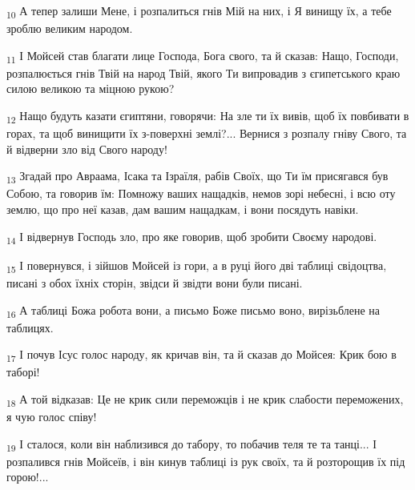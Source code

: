 \begin{tcolorbox}
\textsubscript{10} А тепер залиши Мене, і розпалиться гнів Мій на них, і Я винищу їх, а тебе зроблю великим народом.
\end{tcolorbox}
\begin{tcolorbox}
\textsubscript{11} І Мойсей став благати лице Господа, Бога свого, та й сказав: Нащо, Господи, розпалюється гнів Твій на народ Твій, якого Ти випровадив з єгипетського краю силою великою та міцною рукою?
\end{tcolorbox}
\begin{tcolorbox}
\textsubscript{12} Нащо будуть казати єгиптяни, говорячи: На зле ти їх вивів, щоб їх повбивати в горах, та щоб винищити їх з-поверхні землі?... Вернися з розпалу гніву Свого, та й відверни зло від Свого народу!
\end{tcolorbox}
\begin{tcolorbox}
\textsubscript{13} Згадай про Авраама, Ісака та Ізраїля, рабів Своїх, що Ти їм присягався був Собою, та говорив їм: Помножу ваших нащадків, немов зорі небесні, і всю оту землю, що про неї казав, дам вашим нащадкам, і вони посядуть навіки.
\end{tcolorbox}
\begin{tcolorbox}
\textsubscript{14} І відвернув Господь зло, про яке говорив, щоб зробити Своєму народові.
\end{tcolorbox}
\begin{tcolorbox}
\textsubscript{15} І повернувся, і зійшов Мойсей із гори, а в руці його дві таблиці свідоцтва, писані з обох їхніх сторін, звідси й звідти вони були писані.
\end{tcolorbox}
\begin{tcolorbox}
\textsubscript{16} А таблиці Божа робота вони, а письмо Боже письмо воно, вирізьблене на таблицях.
\end{tcolorbox}
\begin{tcolorbox}
\textsubscript{17} І почув Ісус голос народу, як кричав він, та й сказав до Мойсея: Крик бою в таборі!
\end{tcolorbox}
\begin{tcolorbox}
\textsubscript{18} А той відказав: Це не крик сили переможців і не крик слабости переможених, я чую голос співу!
\end{tcolorbox}
\begin{tcolorbox}
\textsubscript{19} І сталося, коли він наблизився до табору, то побачив теля те та танці... І розпалився гнів Мойсеїв, і він кинув таблиці із рук своїх, та й розторощив їх під горою!...
\end{tcolorbox}
